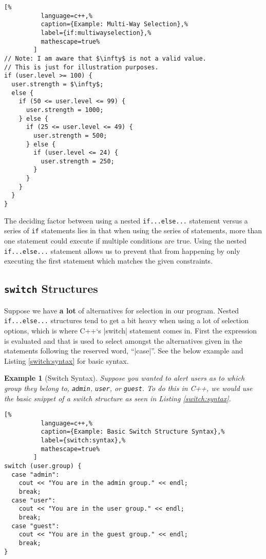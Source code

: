 \documentclass[12pt]{report}
\theoremstyle{definition}
\theoremstyle{plain}
\theoremstyle{plain}
\newtheorem*{examp*}{Example}
\begin{document}
        \begin{lstlisting}[%
          language=c++,%
          caption={Example: Multi-Way Selection},%
          label={if:multiwayselection},%
          mathescape=true%
        ]
// Note: I am aware that $\infty$ is not a valid value.
// This is just for illustration purposes.
if (user.level >= 100) {
  user.strength = $\infty$;
  else {
    if (50 <= user.level <= 99) {
      user.strength = 1000;
    } else {
      if (25 <= user.level <= 49) {
        user.strength = 500;
      } else {
        if (user.level <= 24) {
          user.strength = 250;
        }
      }
    }
  }
}
        \end{lstlisting}

        The deciding factor between using a nested \texttt{if...else...}
          statement versus a series of \texttt{if} statements lies in that when
          using the series of statements, more than one statement could execute
          if multiple conditions are true. Using the nested
          \texttt{if...else...} statement allows us to prevent that from
          happening by only executing the first statement which matches the
          given constraints.

      \newpage
      \subsection{\texttt{switch} Structures}
        Suppose we have \textbf{a lot} of alternatives for selection in our
          program. Nested \texttt{if...else...} structures tend to get a bit
          heavy when using a lot of selection options, which is where C++`s
          |switch| statement comes in. First the expression is evaluated and
          that is used to select amongst the alternatives given in the
          statements following the reserved word, ``|case|''. See the below
          example and Listing \ref{switch:syntax} for basic syntax.

        \begin{examp*}[Switch Syntax]
          Suppose you wanted to alert users as to which group they belong to,
            \texttt{admin}, \texttt{user}, or \texttt{guest}. To do this in C++,
            we would use the basic snippet of a switch structure as seen in
            Listing \ref{switch:syntax}.
        \end{examp*}

        \begin{lstlisting}[%
          language=c++,%
          caption={Example: Basic Switch Structure Syntax},%
          label={switch:syntax},%
          mathescape=true%
        ]
switch (user.group) {
  case "admin":
    cout << "You are in the admin group." << endl;
    break;
  case "user":
    cout << "You are in the user group." << endl;
    break;
  case "guest":
    cout << "You are in the guest group." << endl;
    break;
}
        \end{lstlisting}



  


  \newpage
  \printbibliography[
    heading=bibintoc,
    title={Bibliography}
  ]
\end{document}
